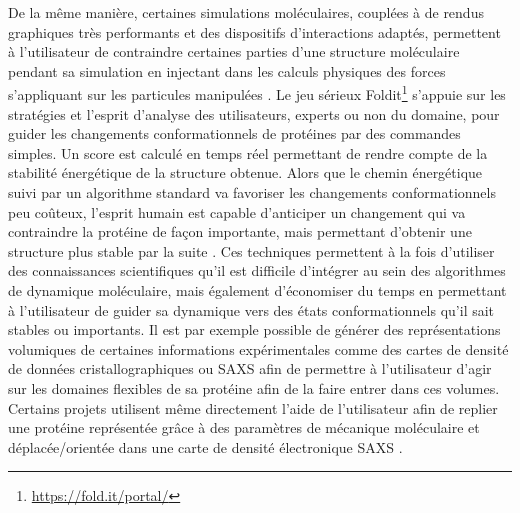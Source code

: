 
De la même manière, certaines simulations moléculaires, couplées à de rendus graphiques très performants et des dispositifs d'interactions adaptés, permettent à l'utilisateur de contraindre certaines parties d'une structure moléculaire pendant sa simulation en injectant dans les calculs physiques des forces s'appliquant sur les particules manipulées \cite{bolopion_comparing_2010}. Le jeu sérieux Foldit\footnote{\url{https://fold.it/portal/}} s'appuie sur les stratégies et l'esprit d'analyse des utilisateurs, experts ou non du domaine, pour guider les changements conformationnels de protéines par des commandes simples. Un score est calculé en temps réel permettant de rendre compte de la stabilité énergétique de la structure obtenue. Alors que le chemin énergétique suivi par un algorithme standard va favoriser les changements conformationnels peu coûteux, l'esprit humain est capable d'anticiper un changement qui va contraindre la protéine de façon importante, mais permettant d'obtenir une structure plus stable par la suite \cite{khatib2011crystal}.
Ces techniques permettent à la fois d'utiliser des connaissances scientifiques qu'il est difficile d'intégrer au sein des algorithmes de dynamique moléculaire, mais également d'économiser du temps en permettant à l'utilisateur de guider sa dynamique vers des états conformationnels qu'il sait stables
ou importants.
Il est par exemple possible de générer des représentations volumiques de certaines informations expérimentales comme des cartes de densité de données cristallographiques ou SAXS afin de permettre à l'utilisateur d'agir sur les domaines flexibles de sa protéine afin de la faire entrer dans ces volumes. Certains projets utilisent même directement l'aide de l'utilisateur afin de replier une protéine représentée grâce à des paramètres de mécanique moléculaire et déplacée/orientée dans une carte de densité électronique SAXS \cite{molza2014innovative,tek2012advances}.

